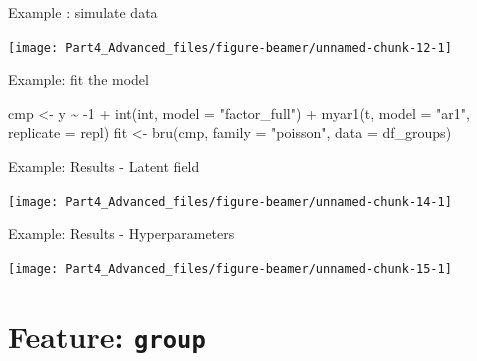 \documentclass[
  ignorenonframetext,
]{beamer}
\newenvironment{Shaded}{\begin{snugshade}}{\end{snugshade}}
\newcommand{\AttributeTok}[1]{\textcolor[rgb]{0.77,0.63,0.00}{#1}}
\newcommand{\DecValTok}[1]{\textcolor[rgb]{0.00,0.00,0.81}{#1}}
\newcommand{\FunctionTok}[1]{\textcolor[rgb]{0.00,0.00,0.00}{#1}}
\newcommand{\NormalTok}[1]{#1}
\newcommand{\OtherTok}[1]{\textcolor[rgb]{0.56,0.35,0.01}{#1}}
\newcommand{\SpecialCharTok}[1]{\textcolor[rgb]{0.00,0.00,0.00}{#1}}
\newcommand{\StringTok}[1]{\textcolor[rgb]{0.31,0.60,0.02}{#1}}
\begin{document}
\begin{frame}{Example : simulate data}
\protect\hypertarget{example-simulate-data-1}{}
\begin{center}\texttt{[image: Part4\_Advanced\_files/figure-beamer/unnamed-chunk-12-1]} \end{center}
\normalsize
\end{frame}

\begin{frame}[fragile]{Example: fit the model}
\protect\hypertarget{example-fit-the-model}{}
\begin{Shaded}
\begin{Highlighting}[]
\NormalTok{cmp }\OtherTok{\textless{}{-}}\NormalTok{ y }\SpecialCharTok{\textasciitilde{}}  \SpecialCharTok{{-}}\DecValTok{1} \SpecialCharTok{+} \FunctionTok{int}\NormalTok{(int,  }\AttributeTok{model =} \StringTok{"factor\_full"}\NormalTok{) }\SpecialCharTok{+}
  \FunctionTok{myar1}\NormalTok{(t, }\AttributeTok{model =} \StringTok{"ar1"}\NormalTok{, }\AttributeTok{replicate =}\NormalTok{ repl)}
\NormalTok{fit }\OtherTok{\textless{}{-}} \FunctionTok{bru}\NormalTok{(cmp, }\AttributeTok{family =} \StringTok{"poisson"}\NormalTok{, }\AttributeTok{data =}\NormalTok{ df\_groups)}
\end{Highlighting}
\end{Shaded}
\end{frame}

\begin{frame}{Example: Results - Latent field}
\protect\hypertarget{example-results---latent-field}{}
\begin{center}\texttt{[image: Part4\_Advanced\_files/figure-beamer/unnamed-chunk-14-1]} \end{center}
\end{frame}

\begin{frame}{Example: Results - Hyperparameters}
\protect\hypertarget{example-results---hyperparameters}{}
\begin{center}\texttt{[image: Part4\_Advanced\_files/figure-beamer/unnamed-chunk-15-1]} \end{center}
\end{frame}

\hypertarget{feature-group}{%
\section{\texorpdfstring{Feature:
\texttt{group}}{Feature: group}}\label{feature-group}}
\end{document}
